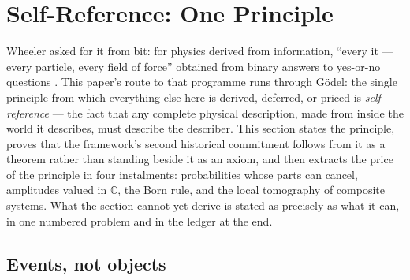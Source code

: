 %
%

\section{Self-Reference: One Principle}
\label{sec:self-reference-2}

Wheeler asked for it from bit: for physics derived from information, ``every it --- every particle,
every field of force'' obtained from binary answers to yes-or-no questions \autocite{Wheeler1990}.
This paper's route to that programme runs through G\"{o}del: the single principle from which
everything else here is derived, deferred, or priced is \emph{self-reference} --- the fact that any
complete physical description, made from inside the world it describes, must describe the describer.
This section states the principle, proves that the framework's second historical commitment follows
from it as a theorem rather than standing beside it as an axiom, and then extracts the price of the
principle in four instalments: probabilities whose parts can cancel, amplitudes valued in
$\mathbb{C}$, the Born rule, and the local tomography of composite systems. What the section cannot
yet derive is stated as precisely as what it can, in one numbered problem and in the ledger at the
end.

\subsection{Events, not objects}

